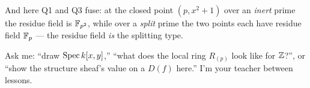 And here Q1 and Q3 fuse: at the closed point $(p,x^2+1)$ over an \emph{inert} prime
the residue field is $\mathbb{F}_{p^2}$, while over a \emph{split} prime the two points each
have residue field $\mathbb{F}_p$ --- the residue field \emph{is} the splitting type.

\begin{intubox}
Ask me: ``draw $\operatorname{Spec} k[x,y]$,'' ``what does the local ring $R_{(p)}$ look like for
$\mathbb{Z}$?'', or ``show the structure sheaf's value on a $D(f)$ here.'' I'm your teacher
between lessons.
\end{intubox}
